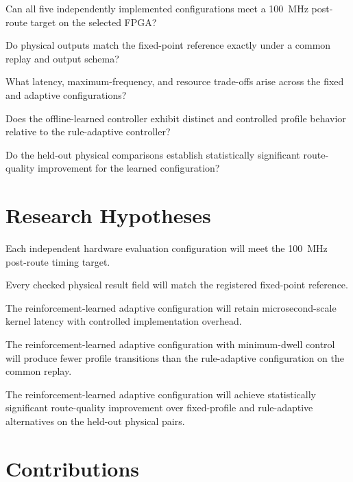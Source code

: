 \begin{description}[leftmargin=1.3cm,style=nextline]
  \item[\textbf{RQ1.}] Can all five independently implemented configurations meet a
  100~MHz post-route target on the selected FPGA?
  \item[\textbf{RQ2.}] Do physical outputs match the fixed-point reference exactly
  under a common replay and output schema?
  \item[\textbf{RQ3.}] What latency, maximum-frequency, and resource trade-offs
  arise across the fixed and adaptive configurations?
  \item[\textbf{RQ4.}] Does the offline-learned controller exhibit distinct and
  controlled profile behavior relative to the rule-adaptive controller?
  \item[\textbf{RQ5.}] Do the held-out physical comparisons establish statistically
  significant route-quality improvement for the learned configuration?
\end{description}

\section{Research Hypotheses}

\begin{description}[leftmargin=1.3cm,style=nextline]
  \item[\textbf{RH1.}] Each independent hardware evaluation configuration will meet
  the 100~MHz post-route timing target.
  \item[\textbf{RH2.}] Every checked physical result field will match the
  registered fixed-point reference.
  \item[\textbf{RH3.}] The reinforcement-learned adaptive configuration will retain
  microsecond-scale kernel latency with controlled implementation overhead.
  \item[\textbf{RH4.}] The reinforcement-learned adaptive configuration with
  minimum-dwell control will produce fewer profile transitions than the
  rule-adaptive configuration on the common replay.
  \item[\textbf{RH5.}] The reinforcement-learned adaptive configuration will achieve
  statistically significant route-quality improvement over fixed-profile and
  rule-adaptive alternatives on the held-out physical pairs.
\end{description}

\section{Contributions}


